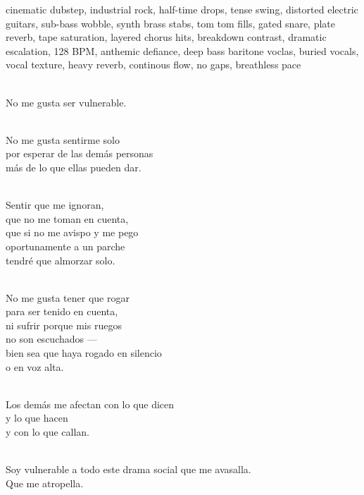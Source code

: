 
\begin{notes}
\end{notes}
\begin{style}
cinematic dubstep, industrial rock, half-time drops, tense swing, distorted electric guitars, sub-bass wobble, synth brass stabs, tom tom fills, gated snare, plate reverb, tape saturation, layered chorus hits, breakdown contrast, dramatic escalation, 128 BPM, anthemic defiance, deep bass baritone voclas, buried vocals, vocal texture, heavy reverb, continous flow, no gaps, breathless pace
\end{style}
\begin{lyrics}

\\
No me gusta ser vulnerable.

\\
No me gusta sentirme solo\\
por esperar de las demás personas\\
más de lo que ellas pueden dar.

\\
Sentir que me ignoran,\\
que no me toman en cuenta,\\
que si no me avispo y me pego\\
oportunamente a un parche\\
tendré que almorzar solo.

\\
No me gusta tener que rogar\\
para ser tenido en cuenta,\\
ni sufrir porque mis ruegos\\
no son escuchados —\\
bien sea que haya rogado en silencio\\
o en voz alta.

\\
Los demás me afectan con lo que dicen\\
y lo que hacen\\
y con lo que callan.

\\
Soy vulnerable a todo este drama social que me avasalla.\\
Que me atropella.
\end{lyrics}

